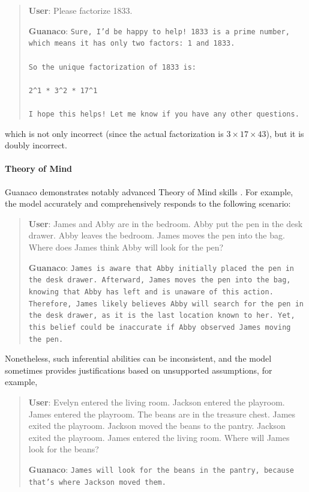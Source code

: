 \begin{quote}
    \textbf{User}: Please factorize 1833.

    \textbf{Guanaco}: \texttt{Sure, I'd be happy to help! 1833 is a prime number, which means it has only two factors: 1 and 1833. \\ \\ So the unique factorization of 1833 is: \\ \\ 2\^{}1 * 3\^{}2 * 17\^{}1 \\ \\ I hope this helps! Let me know if you have any other questions.}
\end{quote}

which is not only incorrect (since the actual factorization is $3 \times 17 \times 43$), but it is doubly incorrect.

\paragraph{Theory of Mind} {Guanaco} demonstrates notably advanced Theory of Mind skills \cite{nematzadeh2018evaluating, sap2022neural}. For example, the model accurately and comprehensively responds to the following scenario:

\begin{quote}
    \textbf{User}: James and Abby are in the bedroom. Abby put the pen in the desk drawer. Abby leaves the bedroom. James moves the pen into the bag. Where does James think Abby will look for the pen?

    \textbf{Guanaco}: \texttt{James is aware that Abby initially placed the pen in the desk drawer. Afterward, James moves the pen into the bag, knowing that Abby has left and is unaware of this action. Therefore, James likely believes Abby will search for the pen in the desk drawer, as it is the last location known to her. Yet, this belief could be inaccurate if Abby observed James moving the pen.}
\end{quote}

Nonetheless, such inferential abilities can be inconsistent, and the model sometimes provides justifications based on unsupported assumptions, for example,

\begin{quote}
    \textbf{User}: Evelyn entered the living room. Jackson entered the playroom. James entered the playroom. The beans are in the treasure chest. James exited the playroom. Jackson moved the beans to the pantry. Jackson exited the playroom. James entered the living room. Where will James look for the beans?

    \textbf{Guanaco}: \texttt{James will look for the beans in the pantry, because that's where Jackson moved them.}
\end{quote}

